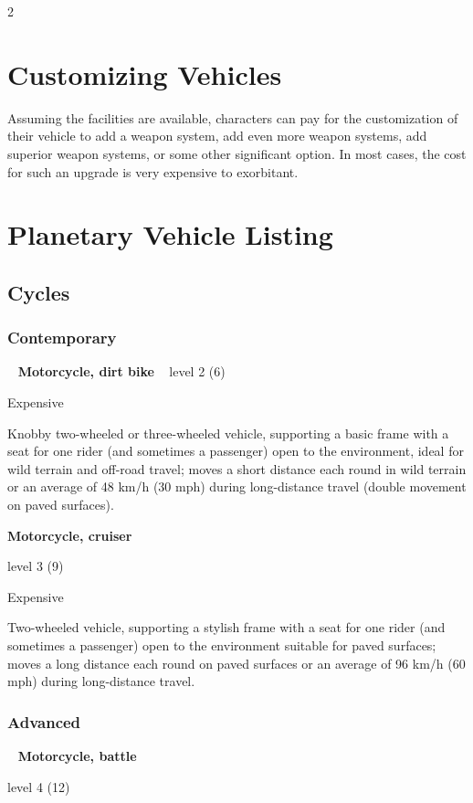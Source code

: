 \begin{multicols}{2}
\section{Customizing Vehicles}

Assuming the facilities are available, characters can pay for the customization of their vehicle to add a weapon system, add even more weapon systems, add superior weapon systems, or some other significant option. In most cases, the cost for such an upgrade is very expensive to exorbitant.

\section{Planetary Vehicle Listing}

\subsection{Cycles} 

\subsubsection{Contemporary}
 
\textbf{Motorcycle, dirt bike}
 
level 2 (6) 

Expensive 

Knobby two-wheeled or three-wheeled vehicle, supporting a basic frame with a seat for one rider (and sometimes a passenger) open to the environment, ideal for wild terrain and off-road travel; moves a short distance each round in wild terrain or an average of 48 km/h (30 mph) during long-distance travel (double movement on paved surfaces). 

\textbf{Motorcycle, cruiser}

level 3 (9) 

Expensive 

Two-wheeled vehicle, supporting a stylish frame with a seat for one rider (and sometimes a passenger) open to the environment suitable for paved surfaces; moves a long distance each round on paved surfaces or an average of 96 km/h (60 mph) during long-distance travel. 

\subsubsection{Advanced}
 
\textbf{Motorcycle, battle}

level 4 (12) 


\end{multicols}
